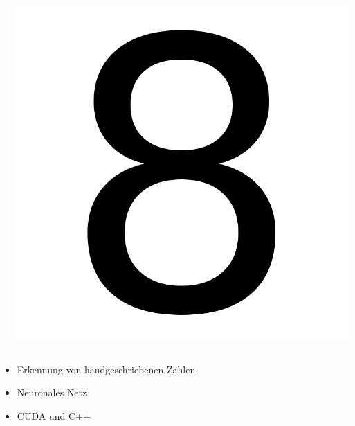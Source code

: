 \documentclass[xcolor=pdftex,dvipsnames,table]{beamer}
\begin{document}
\begin{frame}
\begin{columns}
\begin{column}{0.05\textwidth}
			\end{column}
			\begin{column}{0.25\textwidth}
				\includegraphics[width=1\textwidth]{prediction.png}
			\end{column}
		\end{columns}
	\LARGE
		\begin{itemize}
			\item Erkennung von handgeschriebenen Zahlen
			\item Neuronales Netz
			\item CUDA und C++
		\end{itemize}
		
	\end{frame}
	
\end{document}
